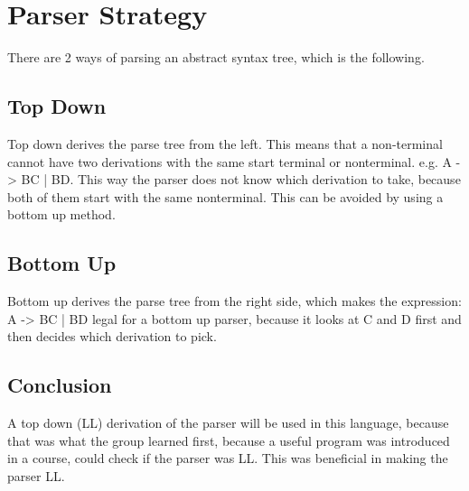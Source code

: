 \section{Parser Strategy}
\label{Parserstrategy}
There are 2 ways of parsing an abstract syntax tree, which is the following.
\subsection*{Top Down}
Top down derives the parse tree from the left. This means that a non-terminal cannot have two derivations with the same start terminal or nonterminal. e.g. A -> BC | BD. This way the parser does not know which derivation to take, because both of them start with the same nonterminal.
This can be avoided by using a bottom up method.


\subsection*{Bottom Up}
Bottom up derives the parse tree from the right side, which makes the expression: A -> BC | BD legal for a bottom up parser, because it looks at C and D first and then decides which derivation to pick.


\subsection*{Conclusion}
A top down (LL) derivation of the parser will be used in this language, because that was what the group learned first, because a useful program was introduced in a course, could check if the parser was LL. This was beneficial in making the parser LL.
